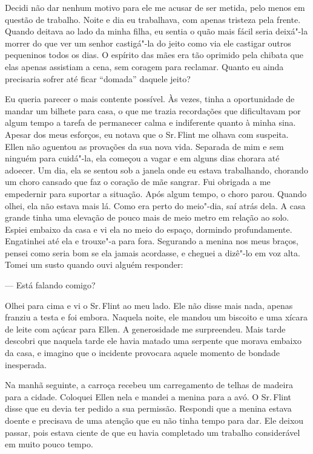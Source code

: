 Decidi não dar nenhum motivo para ele
me acusar de ser metida, pelo menos em questão de trabalho. Noite e dia
eu trabalhava, com apenas tristeza pela frente. Quando deitava ao lado
da minha filha, eu sentia o quão mais fácil seria deixá"-la morrer do que
ver um senhor castigá"-la do jeito como via ele castigar outros
pequeninos todos os dias. O espírito das mães era tão oprimido pela
chibata que elas apenas assistiam a cena, sem coragem para reclamar.
Quanto eu ainda precisaria sofrer até ficar ``domada'' daquele jeito?

Eu queria parecer o mais contente
possível. Às vezes, tinha a oportunidade de mandar um bilhete para casa,
o que me trazia recordações que dificultavam por algum tempo a tarefa de
permanecer calma e indiferente quanto à minha sina. Apesar dos meus
esforços, eu notava que o Sr.\,Flint me olhava com suspeita. Ellen não
aguentou as provações da sua nova vida. Separada de mim e sem ninguém
para cuidá"-la, ela começou a vagar e em alguns dias chorara até adoecer.
Um dia, ela se sentou sob a janela onde eu estava trabalhando, chorando
um choro cansado que faz o coração de mãe sangrar. Fui obrigada a me
empedernir para suportar a situação. Após algum tempo, o choro parou.
Quando olhei, ela não estava mais lá. Como era perto do meio"-dia, saí
atrás dela. A casa grande tinha uma elevação de pouco mais de meio metro
em relação ao solo. Espiei embaixo da casa e vi ela no meio do espaço,
dormindo profundamente. Engatinhei até ela e trouxe"-a para fora.
Segurando a menina nos meus braços, pensei como seria bom se ela jamais
acordasse, e cheguei a dizê"-lo em voz alta. Tomei um susto quando ouvi
alguém responder:

--- Está falando comigo?

Olhei para cima e vi o Sr.\,Flint ao meu lado. Ele não disse mais nada,
apenas franziu a testa e foi embora. Naquela noite, ele mandou um
biscoito e uma xícara de leite com açúcar para Ellen. A generosidade me
surpreendeu. Mais tarde descobri que naquela tarde ele havia matado uma
serpente que morava embaixo da casa, e imagino que o incidente provocara
aquele momento de bondade inesperada.

Na manhã seguinte, a carroça recebeu um
carregamento de telhas de madeira para a cidade. Coloquei Ellen nela e
mandei a menina para a avó. O Sr.\,Flint disse que eu devia ter pedido a
sua permissão. Respondi que a menina estava doente e precisava de uma
atenção que eu não tinha tempo para dar. Ele deixou passar, pois estava
ciente de que eu havia completado um trabalho considerável em muito
pouco tempo.

